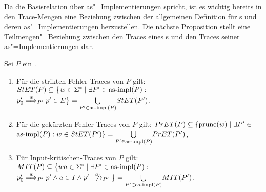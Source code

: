 Da die Basisrelation über as"=Implementierungen spricht, ist es wichtig bereits
in den Trace-Mengen eine Beziehung zwischen der allgemeinen Definition für
\MEIO{}s und deren as"=Implementierungen herzustellen. Die nächste Proposition
stellt eine Teilmengen"=Beziehung zwischen den Traces eines \MEIO{}s und den
Traces seiner as"=Implementierungen dar.

\begin{Prop}
  \label{KommTracesProp}
  Sei $P$ ein \MEIO{}.
  \begin{enumerate}
    \item Für die strikten Fehler-Traces von $P$ gilt: $StET (P) \subseteq
      \big\{w\in\Sigma ^* \mid \exists P' \in\mathrm{as}\text{-}\mathrm{impl} (P) :$ $p'_0
      \weakmust[w]_{P'} p' \in E\big\} = \underset{P' \in\asimp (P)}{\bigcup}
      \StET (P')$.
    \item Für die gekürzten Fehler-Traces von $P$ gilt: $PrET (P) \subseteq
      \{\mathrm{prune} (w) \mid \exists P' \in$\linebreak $\mathrm{as}\text{-}\mathrm{impl} (P) : w\in StET (P')
      \} = \underset{P' \in\mathrm{as}\text{-}\mathrm{impl} (P)}{\bigcup} PrET (P')$,
    \item Für Input-kritischen-Traces von $P$ gilt: $MIT (P) \subseteq
      \big\{wa\in\Sigma ^* \mid \exists P' \in\mathrm{as}\text{-}\mathrm{impl} (P) :$ $p'_0
      \weakmust[w]_{P'} p' \land a\in I\land p'\nmust[a]_{P'} \big\} =
      \underset{P' \in\asimp (P)}{\bigcup} \MIT (P')$.
  \end{enumerate}
\end{Prop}
